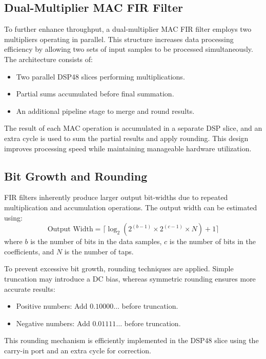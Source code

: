 \documentclass{article}
\begin{document}
	\subsection{Dual-Multiplier MAC FIR Filter}
	To further enhance throughput, a dual-multiplier MAC FIR filter employs two multipliers operating in parallel. This structure increases data processing efficiency by allowing two sets of input samples to be processed simultaneously. The architecture consists of:
	\begin{itemize}
		\item Two parallel DSP48 slices performing multiplications.
		\item Partial sums accumulated before final summation.
		\item An additional pipeline stage to merge and round results.
	\end{itemize}
	The result of each MAC operation is accumulated in a separate DSP slice, and an extra cycle is used to sum the partial results and apply rounding. This design improves processing speed while maintaining manageable hardware utilization.
	
	\subsection{Bit Growth and Rounding}
	FIR filters inherently produce larger output bit-widths due to repeated multiplication and accumulation operations. The output width can be estimated using:
	\begin{equation}
		\text{Output Width} = \lceil \log_2 (2^{(b-1)} \times 2^{(c-1)} \times N) + 1 \rceil
	\end{equation}
	where \( b \) is the number of bits in the data samples, \( c \) is the number of bits in the coefficients, and \( N \) is the number of taps.
	
	To prevent excessive bit growth, rounding techniques are applied. Simple truncation may introduce a DC bias, whereas symmetric rounding ensures more accurate results:
	\begin{itemize}
		\item Positive numbers: Add \( 0.10000\ldots \) before truncation.
		\item Negative numbers: Add \( 0.01111\ldots \) before truncation.
	\end{itemize}
	This rounding mechanism is efficiently implemented in the DSP48 slice using the carry-in port and an extra cycle for correction.
	
\end{document}
